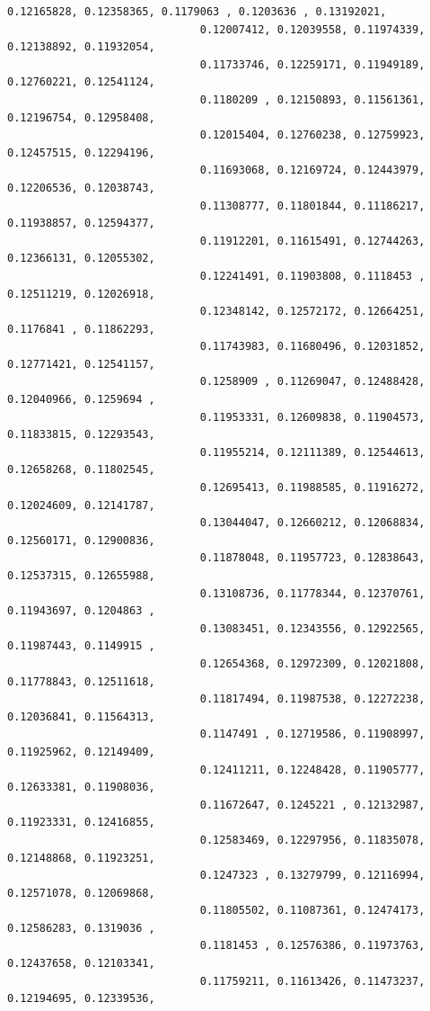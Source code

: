 \documentclass[11pt]{article}
\begin{document}
\begin{Verbatim}[commandchars=\\\{\}]
                              0.12165828, 0.12358365, 0.1179063 , 0.1203636 , 0.13192021,
                              0.12007412, 0.12039558, 0.11974339, 0.12138892, 0.11932054,
                              0.11733746, 0.12259171, 0.11949189, 0.12760221, 0.12541124,
                              0.1180209 , 0.12150893, 0.11561361, 0.12196754, 0.12958408,
                              0.12015404, 0.12760238, 0.12759923, 0.12457515, 0.12294196,
                              0.11693068, 0.12169724, 0.12443979, 0.12206536, 0.12038743,
                              0.11308777, 0.11801844, 0.11186217, 0.11938857, 0.12594377,
                              0.11912201, 0.11615491, 0.12744263, 0.12366131, 0.12055302,
                              0.12241491, 0.11903808, 0.1118453 , 0.12511219, 0.12026918,
                              0.12348142, 0.12572172, 0.12664251, 0.1176841 , 0.11862293,
                              0.11743983, 0.11680496, 0.12031852, 0.12771421, 0.12541157,
                              0.1258909 , 0.11269047, 0.12488428, 0.12040966, 0.1259694 ,
                              0.11953331, 0.12609838, 0.11904573, 0.11833815, 0.12293543,
                              0.11955214, 0.12111389, 0.12544613, 0.12658268, 0.11802545,
                              0.12695413, 0.11988585, 0.11916272, 0.12024609, 0.12141787,
                              0.13044047, 0.12660212, 0.12068834, 0.12560171, 0.12900836,
                              0.11878048, 0.11957723, 0.12838643, 0.12537315, 0.12655988,
                              0.13108736, 0.11778344, 0.12370761, 0.11943697, 0.1204863 ,
                              0.13083451, 0.12343556, 0.12922565, 0.11987443, 0.1149915 ,
                              0.12654368, 0.12972309, 0.12021808, 0.11778843, 0.12511618,
                              0.11817494, 0.11987538, 0.12272238, 0.12036841, 0.11564313,
                              0.1147491 , 0.12719586, 0.11908997, 0.11925962, 0.12149409,
                              0.12411211, 0.12248428, 0.11905777, 0.12633381, 0.11908036,
                              0.11672647, 0.1245221 , 0.12132987, 0.11923331, 0.12416855,
                              0.12583469, 0.12297956, 0.11835078, 0.12148868, 0.11923251,
                              0.1247323 , 0.13279799, 0.12116994, 0.12571078, 0.12069868,
                              0.11805502, 0.11087361, 0.12474173, 0.12586283, 0.1319036 ,
                              0.1181453 , 0.12576386, 0.11973763, 0.12437658, 0.12103341,
                              0.11759211, 0.11613426, 0.11473237, 0.12194695, 0.12339536,

\end{Verbatim}
\end{document}
